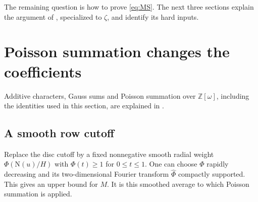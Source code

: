 \documentclass[11pt]{article}
\newcommand{\OO}{\mathbb Z[\omega]}
\newcommand{\N}{\mathrm N}
\numberwithin{equation}{section}
\begin{document}
The remaining question is how to prove \eqref{eq:MS}. The next three
sections explain the argument of \cite{original}, specialized to $\zeta$, and identify its hard inputs.

\section{Poisson summation changes the coefficients}\label{sec:poisson}

Additive characters, Gauss sums and Poisson summation over $\OO$, including the identities
used in this section, are explained in \cite[Section~4]{QF}.

\subsection{A smooth row cutoff}
Replace the disc cutoff by a fixed nonnegative smooth radial weight
$\Phi(\N(u)/H)$ with $\Phi(t)\ge1$ for $0\le t\le1$. One can choose
$\Phi$ rapidly decreasing and its two-dimensional Fourier transform
$\widehat\Phi$ compactly supported. This gives an upper bound for $M$.
It is this smoothed average to which Poisson summation is applied.
\end{document}
